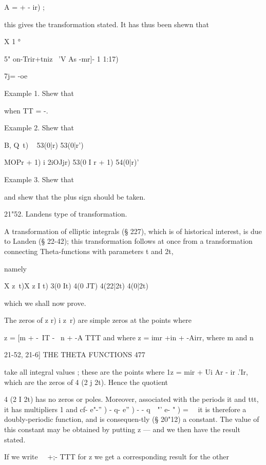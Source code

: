 A = +  - ir)  ; 

this gives the transformation stated. 
It has thus been shewn that 

X 1 °  

5" on-Trir+tniz \  'V As -mr]- 1  1:17) 



7j= -oe 

Example 1. Shew that 

when TT = -.  

Example 2. Shew that 



B, Q\ t) \  %
53(0|r) 53(0|r') 



MOPr + 1)  i  2iOJjr) 
53(0 I r + 1) 54(0|r)' 



Example 3. Shew that 

and shew that the plus sign should be taken. 

21"52. Landens type of transformation. 

A transformation of elliptic integrals (§ 227), which is of historical 
interest, is due to Landen (§ 22-42); this transformation follows at once 
from a transformation connecting Theta-functions with parameters t and 2t, 

namely 

X  z\ t)X  z I t)  3(0 It)  4(0 JT) 
 4(22|2t)  4(0|2t) 

which we shall now prove. 

The zeros of   z r) i z\ r) are simple zeros at the points where 

z = [m + -\ IT -  \ n + -A TTT and where z = imr +in + -Airr, where m and n 



21-52, 21-6] THE THETA FUNCTIONS 477 

take all integral values ; these are the points where 1z = mir + Ui Ar - ir .'Ir, 
which are the zeros of  4 (2  j 2t). Hence the quotient 

 4 (2  I 2t) 
has no zeros or poles. Moreover, associated with the periods it and ttt, it 
has multipliers 1 and  cf-  e"-'' )   - q-  e''  ) -   - q~~"' e- " ) = \ \ it is therefore 
a doubly-periodic function, and is consequen-tly (§ 20"12) a constant. The 
value of this constant may be obtained by putting z —   and we then have 
the result stated. 

If we write \ \   +;- TTT for z  we get a corresponding result for the other 

